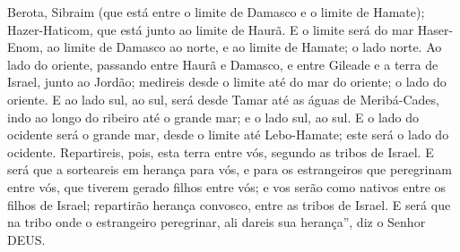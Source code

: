{  Berota, Sibraim (que está entre o limite de Damasco e o limite de Hamate); Hazer-Haticom, que está junto ao limite de Haurã.
  E o limite será do mar
{} Haser-Enom, ao limite de Damasco ao norte, e ao limite de Hamate;
{} o lado norte.
  Ao lado do oriente, passando entre Haurã e Damasco, e entre Gileade e a terra de Israel, junto ao Jordão; medireis desde o limite até do mar do oriente;
{} o lado do oriente.
  E ao lado sul, ao sul, será desde Tamar até as águas de Meribá-Cades, indo ao longo do ribeiro até o grande mar; e
{} o lado sul, ao sul.
  E o lado do ocidente será o grande mar, desde o limite até Lebo-Hamate; este será o lado do ocidente.
  Repartireis, pois, esta terra entre vós, segundo as tribos de Israel.
  E será que a sorteareis em herança para vós, e para os estrangeiros que peregrinam entre vós, que tiverem gerado filhos entre vós; e vos serão como nativos entre os filhos de Israel; repartirão herança convosco, entre as tribos de Israel.
  E será que na tribo onde o estrangeiro peregrinar, ali
{} dareis sua herança”, diz o Senhor DEUS.
\par }

